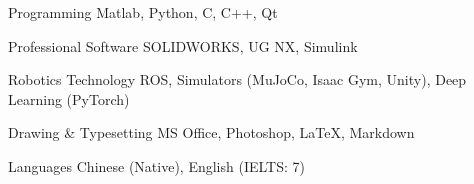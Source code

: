 \vspace{-7mm}
\begin{cvskills}
\cvskill
   {Programming} %
    {Matlab, Python, C, C++, Qt} %

  \cvskill
   {Professional Software} %
   {SOLIDWORKS, UG NX, Simulink} %

  \cvskill
   {Robotics Technology} %
   {ROS, Simulators (MuJoCo, Isaac Gym, Unity), Deep Learning (PyTorch)} %

  \cvskill
{Drawing \& Typesetting} %
{MS Office, Photoshop, \textrm{\LaTeX}, Markdown} %

  \cvskill
   {Languages} %
   {Chinese (Native), English (IELTS: 7)} %
\end{cvskills}
